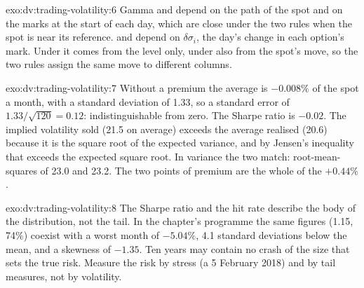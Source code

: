 \begin{solution}{exo:dv:trading-volatility:6}
Gamma and  depend on the path of the spot and on the marks at the start of each day, which are close under the two rules when the spot is near
its reference.  and  depend on $\delta\sigma_i$, the day's change in each option's mark. Under  it comes from the level only,
under  also from the spot's move, so the two rules assign the same move to different columns.
\end{solution}

\begin{solution}{exo:dv:trading-volatility:7}
Without a premium the average is $-0.008\%$ of the spot a month, with a standard deviation of 1.33, so a standard error of $1.33/\sqrt{120}=0.12$: indistinguishable
from zero. The Sharpe ratio is $-0.02$. The implied volatility sold (21.5 on average) exceeds the average realised (20.6) because it is the square root of the
expected variance, and by Jensen's inequality that exceeds the expected square root. In variance the two match: root-mean-squares of 23.0 and 23.2. The two
points of premium are the whole of the $+0.44\%$.
\end{solution}

\begin{solution}{exo:dv:trading-volatility:8}
The Sharpe ratio and the hit rate describe the body of the distribution, not the tail. In the chapter's programme the same figures (1.15, 74\%) coexist with a
worst month of $-5.04\%$, 4.1 standard deviations below the mean, and a skewness of $-1.35$. Ten years may contain no crash of the size that sets the true risk. Measure the
risk by stress (a 5 February 2018) and by tail measures, not by volatility.
\end{solution}


